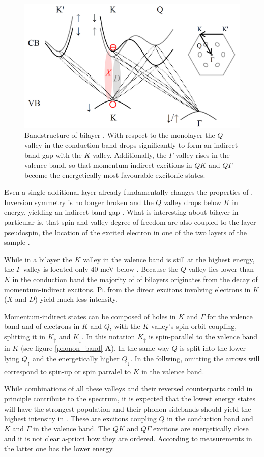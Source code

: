 \begin{figure}[t]
\centering
\includegraphics[width=.75\textwidth]{bilayerbands}
\caption{Bandstructure of bilayer \wse\!  \cite{lindlau_role_2017}. With respect to the monolayer the $Q$ valley in the conduction band drops significantly to form an indirect band gap with the $K$ valley. Additionally, the $\Gamma$ valley rises in the valence band, so that momentum-indirect excitions in $QK$ and $Q\Gamma$ become the energetically most favourable excitonic states.}
\label{bandgap}

\end{figure}

Even a single additional layer already fundamentally changes the properties of \wse\!. Inversion symmetry is no longer broken and the $Q$ valley drops below $K$ in energy, yielding an indirect band gap \cite{zibouche_transition-metal_2014_2}. What is interesting about bilayer \wse in particular is, that spin and valley degree of freedom are also coupled to the layer pseudospin, the location of the excited electron in one of the two layers of the sample \cite{jones_spin-layer_2014}. 

While in a bilayer the $K$ valley in the valence band is still at the highest energy, the $\Gamma$ valley is located only 40 meV below \cite{wilson_determination_2017}. Because the $Q$ valley lies lower than $K$ in the conduction band the majority of \pl of \wse bilayers originates from the decay of momentum-indirect excitons. \textsc{Pl} from the direct excitons involving electrons in $K$ ($X$ and $D$) yield much less intensity.

Momentum-indirect states can be composed of holes in $K$ and $\Gamma$ for the valence band and of electrons in $K$ and $Q$, with the $K$ valley's spin orbit coupling, splitting it in $K_\uparrow$ and $K_\downarrow$. In this notation $K_\uparrow$ is spin-parallel to the valence band in $K$ (see figure \ref{phonon_band} \textbf{A}). In the same way $Q$ is split into the lower lying $Q_\uparrow$ and the energetically higher $Q_\downarrow$. In the follwing, omitting the arrows will correspond to spin-up or spin parralel to $K$ in the valence band.

While combinations of all these valleys and their reversed counterparts could in principle contribute to the \pl spectrum, it is expected that the lowest energy states will have the strongest population and their phonon sidebands should yield the highest intensity in \pl\!. These are excitons coupling $Q$ in the conduction band and $K$ and $\Gamma$ in the valence band. The $QK$ and $Q\Gamma$ excitons are energetically close and it is not clear a-priori how they are ordered. According to measurements in  \cite{lindlau_role_2017} the latter one has the lower energy. 